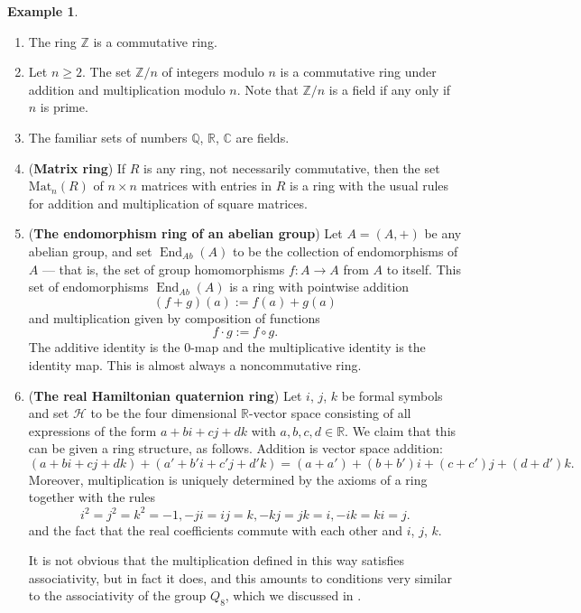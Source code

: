 \documentclass[12pt]{report}
\numberwithin{equation}{section}
\numberwithin{theorem}{chapter}
\theoremstyle{definition}
\newtheorem{example}[theorem]{Example}
\newtheorem*{basic properties}{Basic Properties}
\newtheorem*{Important Remark}{Important Remark}
\newcommand{\C}{\mathbb{C}}
\DeclareMathOperator{\End}{End}
\begin{document}
\begin{example}
\begin{enumerate}[itemsep=0.2em,leftmargin=20pt]
\item The ring $\mathbb{Z}$ is a commutative ring.

\item Let $n \geqslant 2$. The set $\mathbb{Z}/n$ of integers modulo $n$ is a commutative ring under addition and multiplication modulo $n$. Note that $\mathbb{Z}/n$ is a field if any only if $n$ is prime.

\item The familiar sets of numbers $\mathbb{Q}$, $\mathbb{R}$, $\C$ are fields.


\item ({\bf Matrix ring}) If $R$ is any ring, not necessarily commutative, then the set $\mathrm{Mat}_{n}(R)$ of $n \times n$ matrices with entries in $R$ is a ring with the usual rules for addition and multiplication of square matrices.

\item ({\bf The endomorphism ring of an abelian group}) Let $A = (A, +)$ be any abelian group, and set $\End_{Ab}(A)$ to be the collection of endomorphisms of $A$ --- that is, the set of group homomorphisms $f\!: A \longrightarrow A$ from $A$ to itself. 
This set of endomorphisms $\End_{Ab}(A)$ is a ring with pointwise addition 
$$(f + g)(a) := f(a) + g(a)$$ 
and multiplication given by composition of functions
$$f \cdot g := f \circ g.$$ 
The additive identity is the $0$-map and the multiplicative identity is the identity map. 
This is almost always a noncommutative ring.


\item ({\bf The real Hamiltonian quaternion ring}) Let $i$, $j$, $k$ be formal symbols and set $\mathcal{H}$ to be the four dimensional $\mathbb{R}$-vector space consisting of all expressions of the form $a + bi + cj + dk$ with $a,b,c,d \in \mathbb{R}$. We claim that this can be given a ring structure, as follows. Addition is vector space addition:
$$(a + bi + cj + dk) +(a' + b'i + c'j + d'k) = (a + a') + (b + b') i + (c + c')j + (d + d')k.$$
Moreover, multiplication is uniquely determined by the axioms of a ring together with the rules
$$i^2 = j^2 = k^2 = -1, -ji = ij = k, -kj = jk = i, -ik = ki = j.$$
and the fact that the real coefficients commute with each other and $i$, $j$, $k$.

It is not obvious that the multiplication defined in this way satisfies associativity, but in fact it does, and this amounts to conditions very similar to the associativity of the group $Q_8$, which we discussed in . 


\end{enumerate}
\end{example}
\end{document}
